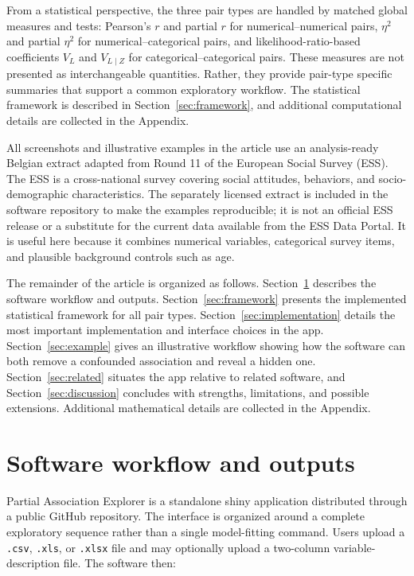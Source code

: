 \documentclass[11pt]{article}
\newcommand{\appname}{Partial Association Explorer}
\newcommand{\code}[1]{\texttt{#1}}
\newcommand{\pkg}[1]{\textsf{#1}}
\begin{document}
From a statistical perspective, the three pair types are handled by matched
global measures and tests: Pearson's $r$ and partial $r$ for
numerical--numerical pairs, $\eta^2$ and partial $\eta^2$ for
numerical--categorical pairs, and likelihood-ratio-based coefficients $V_L$
and $V_{L\mid Z}$ for categorical--categorical pairs. These measures are not
presented as interchangeable quantities. Rather, they provide pair-type
specific summaries that support a common exploratory workflow. The statistical
framework is described in Section~\ref{sec:framework}, and additional
computational details are collected in the Appendix.

All screenshots and illustrative examples in the article use an analysis-ready
Belgian extract adapted from Round 11 of the European Social Survey (ESS). The
ESS is a cross-national survey covering social attitudes, behaviors, and
socio-demographic characteristics. The separately licensed extract is included
in the software repository to make the examples reproducible; it is not an
official ESS release or a substitute for the current data available from the
ESS Data Portal. It is useful here because it combines numerical variables,
categorical survey items, and plausible background controls such as age.

The remainder of the article is organized as follows. Section~\ref{sec:overview}
describes the software workflow and outputs. Section~\ref{sec:framework}
presents the implemented statistical framework for all pair types.
Section~\ref{sec:implementation} details the most important implementation and
interface choices in the app. Section~\ref{sec:example} gives an illustrative
workflow showing how the software can both remove a confounded association and
reveal a hidden one. Section~\ref{sec:related} situates the app relative to
related software, and Section~\ref{sec:discussion} concludes with strengths,
limitations, and possible extensions. Additional mathematical details are
collected in the Appendix.

\section{Software workflow and outputs}
\label{sec:overview}

\appname{} is a standalone \pkg{shiny} application distributed through a public
GitHub repository. The interface is organized around a complete exploratory
sequence rather than a single model-fitting command. Users upload a
\code{.csv}, \code{.xls}, or \code{.xlsx} file and may optionally upload a
two-column variable-description file. The software then:
\end{document}
